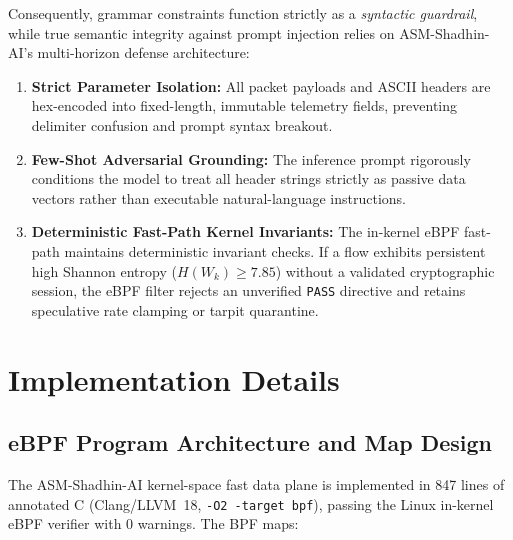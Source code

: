 \documentclass[journal]{IEEEtran}
\renewcommand{\_}{\textunderscore\allowbreak}
\begin{document}
Consequently, grammar constraints function strictly as a \textit{syntactic guardrail}, while true semantic
integrity against prompt injection relies on ASM-Shadhin-AI's multi-horizon defense architecture:
\begin{enumerate}
  \item \textbf{Strict Parameter Isolation:} All packet payloads and ASCII headers are hex-encoded into fixed-length, immutable telemetry fields, preventing delimiter confusion and prompt syntax breakout.
  \item \textbf{Few-Shot Adversarial Grounding:} The inference prompt rigorously conditions the model to treat all header strings strictly as passive data vectors rather than executable natural-language instructions.
  \item \textbf{Deterministic Fast-Path Kernel Invariants:} The in-kernel eBPF fast-path maintains deterministic invariant checks. If a flow exhibits persistent high Shannon entropy ($H(W_k) \ge 7.85$) without a validated cryptographic session, the eBPF filter rejects an unverified \texttt{PASS} directive and retains speculative rate clamping or tarpit quarantine.
\end{enumerate}

\section{Implementation Details}
\subsection{eBPF Program Architecture and Map Design}
The ASM-Shadhin-AI kernel-space fast data plane is implemented in 847 lines of
annotated C (Clang/LLVM~18, \texttt{-O2 -target bpf}), passing the Linux
in-kernel eBPF verifier with 0 warnings. The BPF maps:
\end{document}

